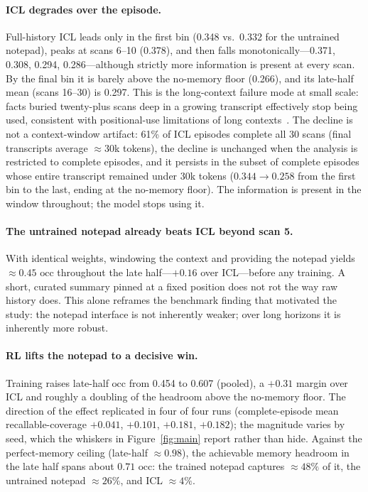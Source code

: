 \documentclass[11pt]{article}
\newcommand{\occ}{\ensuremath{\mathrm{occ}}}
\begin{document}
\paragraph{ICL degrades over the episode.}
Full-history ICL leads only in the first bin (0.348 vs.\ 0.332 for the untrained
notepad), peaks at scans 6--10 (0.378), and then falls monotonically---0.371,
0.308, 0.294, 0.286---although strictly more information is present at every
scan. By the final bin it is barely above the no-memory floor (0.266), and its
late-half mean (scans 16--30) is 0.297. This is the long-context failure mode
at small scale: facts buried twenty-plus scans deep in a growing transcript
effectively stop being used, consistent with positional-use limitations of long
contexts~\cite{lostinthemiddle}. The decline is not a context-window artifact:
61\% of ICL episodes complete all 30 scans (final transcripts average
${\approx}30$k tokens), the decline is unchanged when the analysis is restricted
to complete episodes, and it persists in the subset of complete episodes whose
entire transcript remained under 30k tokens ($0.344 \rightarrow 0.258$ from the
first bin to the last, ending at the no-memory floor). The information is present
in the window throughout; the model stops using it.

\paragraph{The untrained notepad already beats ICL beyond scan 5.}
With identical weights, windowing the context and providing the notepad yields
${\approx}0.45$ \occ{} throughout the late half---$+0.16$ over ICL---before any
training. A short, curated summary pinned at a fixed position does not rot the
way raw history does. This alone reframes the benchmark finding that motivated the
study: the notepad interface is not inherently weaker; over long horizons it is
inherently more robust.

\paragraph{RL lifts the notepad to a decisive win.}
Training raises late-half \occ{} from 0.454 to 0.607 (pooled), a $+0.31$ margin
over ICL and roughly a doubling of the headroom above the no-memory floor. The
direction of the effect replicated in four of four runs (complete-episode mean
recallable-coverage $+0.041$, $+0.101$, $+0.181$, $+0.182$); the magnitude varies
by seed, which the whiskers in Figure~\ref{fig:main} report rather than hide.
Against the perfect-memory ceiling (late-half ${\approx}0.98$), the achievable
memory headroom in the late half spans about $0.71$ \occ{}: the trained notepad
captures ${\approx}48\%$ of it, the untrained notepad ${\approx}26\%$, and ICL
${\approx}4\%$.
\end{document}
